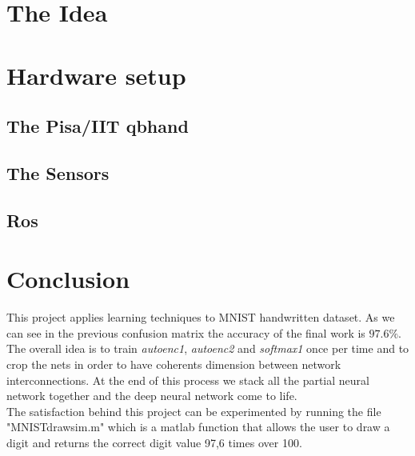 \chapter{The Idea}
\chapter{Hardware setup}
\section{The Pisa/IIT qbhand}
\section{The Sensors}
\section{}
\section{Ros}


\chapter*{Conclusion}
This project applies learning \cite{art:rif.1} techniques to MNIST handwritten dataset. As we can see in the previous confusion matrix the accuracy of the final work is $97.6\%$. The overall idea is to train \emph{autoenc1},  \emph{autoenc2} and \emph{softmax1} once per time and to crop the nets in order to have coherents dimension between network interconnections. At the end of \cite{book:rif.2}this process we stack all the partial neural network together and the deep neural network come to life. \\The satisfaction behind this project can be experimented by running the file "MNIST\textunderscore drawsim.m" which is a matlab function that allows the user to draw a digit and returns the correct digit value 97,6 times over 100.